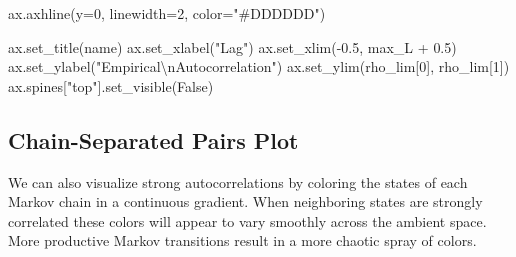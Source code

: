 \documentclass[
  letterpaper,
  DIV=11,
  numbers=noendperiod]{scrartcl}
\newenvironment{Shaded}{\begin{snugshade}}{\end{snugshade}}
\newcommand{\CharTok}[1]{\textcolor[rgb]{0.13,0.47,0.30}{#1}}
\newcommand{\DecValTok}[1]{\textcolor[rgb]{0.68,0.00,0.00}{#1}}
\newcommand{\FloatTok}[1]{\textcolor[rgb]{0.68,0.00,0.00}{#1}}
\newcommand{\NormalTok}[1]{\textcolor[rgb]{0.00,0.23,0.31}{#1}}
\newcommand{\OperatorTok}[1]{\textcolor[rgb]{0.37,0.37,0.37}{#1}}
\newcommand{\StringTok}[1]{\textcolor[rgb]{0.13,0.47,0.30}{#1}}
\newcommand{\VariableTok}[1]{\textcolor[rgb]{0.07,0.07,0.07}{#1}}
\begin{document}
\begin{Shaded}
\begin{Highlighting}[]
\NormalTok{  ax.axhline(y}\OperatorTok{=}\DecValTok{0}\NormalTok{, linewidth}\OperatorTok{=}\DecValTok{2}\NormalTok{, color}\OperatorTok{=}\StringTok{"\#DDDDDD"}\NormalTok{)}
  
\NormalTok{  ax.set\_title(name)}
\NormalTok{  ax.set\_xlabel(}\StringTok{"Lag"}\NormalTok{)}
\NormalTok{  ax.set\_xlim(}\OperatorTok{{-}}\FloatTok{0.5}\NormalTok{, max\_L }\OperatorTok{+} \FloatTok{0.5}\NormalTok{)}
\NormalTok{  ax.set\_ylabel(}\StringTok{"Empirical}\CharTok{\textbackslash{}n}\StringTok{Autocorrelation"}\NormalTok{)}
\NormalTok{  ax.set\_ylim(rho\_lim[}\DecValTok{0}\NormalTok{], rho\_lim[}\DecValTok{1}\NormalTok{])}
\NormalTok{  ax.spines[}\StringTok{"top"}\NormalTok{].set\_visible(}\VariableTok{False}\NormalTok{)}
\end{Highlighting}
\end{Shaded}

\hypertarget{chain-separated-pairs-plot}{%
\subsection{Chain-Separated Pairs
Plot}\label{chain-separated-pairs-plot}}

We can also visualize strong autocorrelations by coloring the states of
each Markov chain in a continuous gradient. When neighboring states are
strongly correlated these colors will appear to vary smoothly across the
ambient space. More productive Markov transitions result in a more
chaotic spray of colors.
\end{document}
